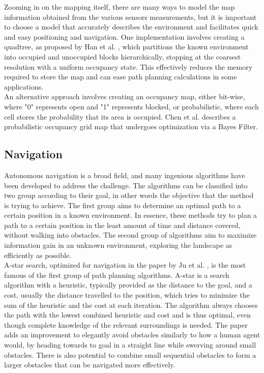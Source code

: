 Zooming in on the mapping itself, there are many ways to model the map information obtained from the various sensors measurements, but it is important to choose a model that accurately describes the environment and facilitates quick and easy positioning and navigation. One implementation involves creating a quadtree, as proposed by Han et al. \cite{6393370}, which partitions the known environment into occupied and unoccupied blocks hierarchically, stopping at the coarsest resolution with a uniform occupancy state. This effectively reduces the memory required to store the map and can ease path planning calculations in some applications. \\

An alternative approach involves creating an occupancy map, either bit-wise, where "0" represents open and "1" represents blocked, or probabilistic, where each cell stores the probability that its area is occupied. Chen et al. \cite{9178471} describes a probabilistic occupancy grid map that undergoes optimization via a Bayes Filter.

\subsection{Navigation}

Autonomous navigation is a broad field, and many ingenious algorithms have been developed to address the challenge. The algorithms can be classified into two group according to their goal, in other words the objective that the method is trying to achieve. The first group aims to determine an optimal path to a certain position in a known environment. In essence, these methods try to plan a path to a certain position in the least amount of time and distance covered, without walking into obstacles. The second group of algorithms aim to maximize information gain in an unknown environment, exploring the landscape as efficiently as possible.  \\

A-star search, optimized for navigation in the paper by Ju et al. \cite{9296641}, is the most famous of the first group of path planning algorithms. A-star is a search algorithm with a heuristic, typically provided as the distance to the goal, and a cost, usually the distance travelled to the position, which tries to minimize the sum of the heuristic and the cost at each iteration. The algorithm always chooses the path with the lowest combined heuristic and cost and is thus optimal, even though complete knowledge of the relevant surroundings is needed. The paper adds an improvement to elegantly avoid obstacles similarly to how a human agent would, by heading towards to goal in a straight line while swerving around small obstacles. There is also potential to combine small sequential obstacles to form a larger obstacles that can be navigated more effectively. \\

